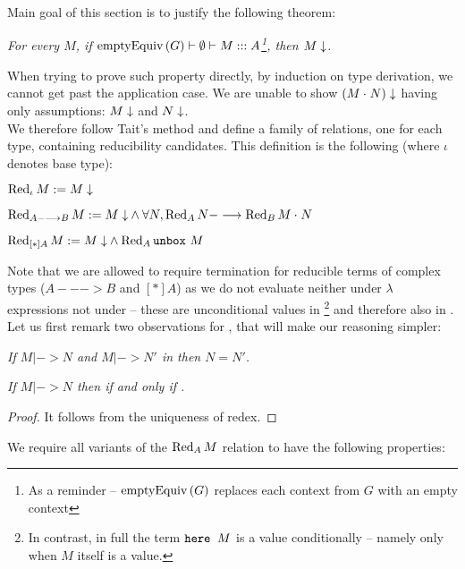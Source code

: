 Main goal of this section is to justify the following theorem:

\begin{introtheorem}\em
For every $M$, if $\emptyEq G |- \nnil |- M ::: A$\footnote{As a reminder -- $\emptyEq{G}$ replaces each context from $G$ with an empty context}, then $\termin{M}$. 
\end{introtheorem}

When trying to prove such property directly, by induction on type derivation, we cannot get past the application case. We are unable to  show $\termin{(\appl{M}{N})}$ having only assumptions: $\termin{M}$ and $\termin{N}$.\\

We therefore follow Tait's method and define a family of relations, one for each type, containing reducibility candidates.
This definition is the following (where $\iota$ denotes base type):
\begin{description}
\item $\Red{M}{\iota} := \termin{M}$
\item $\Red{M}{A ---> B} := \termin{M} \wedge \forall N, \Red{N}{A} ---> \Red{\appl{M}{N}}{B}$
\item $\Red{M}{[*]A} := \termin{M} \wedge \Red{\unboxe{}\ {M}}{A}$
\end{description}

Note that we are allowed to require termination for reducible terms of complex types ($A--->B$ and $[*]A$) as we do not evaluate neither under $\lambda$ expressions not under \bboxe{} -- these are unconditional values in \langLF{}\footnote{In contrast, in full \langLF{} the term $\here{M}$ is a value conditionally --  namely only when $M$ itself is a value.} and therefore also in \nodiaLangLF{}.\\
 
Let us first remark two observations for \nodiaLangLF{}, that will make our reasoning simpler:
\begin{observation}\em
If $M |->N$ and $M |-> N'$ in \nodiaLangLF{} then $N = N'$.
\end{observation}

\begin{observation}\em
If $M |-> N$ then  if and only if .
\begin{proof}
It follows from the uniqueness of redex.
\end{proof}
\end{observation}
\newpage
We require all variants of the $\Red{M}{A}$ relation to have the following properties:

